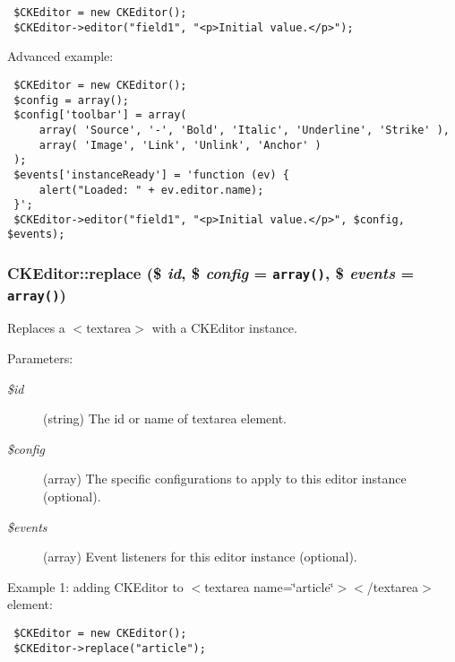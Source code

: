 \begin{Code}\begin{verbatim} $CKEditor = new CKEditor();
 $CKEditor->editor("field1", "<p>Initial value.</p>");
\end{verbatim}
\end{Code}



Advanced example: 

\begin{Code}\begin{verbatim} $CKEditor = new CKEditor();
 $config = array();
 $config['toolbar'] = array(
     array( 'Source', '-', 'Bold', 'Italic', 'Underline', 'Strike' ),
     array( 'Image', 'Link', 'Unlink', 'Anchor' )
 );
 $events['instanceReady'] = 'function (ev) {
     alert("Loaded: " + ev.editor.name);
 }';
 $CKEditor->editor("field1", "<p>Initial value.</p>", $config, $events);
\end{verbatim}
\end{Code}

 \hypertarget{classCKEditor_82ebacb89f96be38393ebd53a6a9ab52}{
\subsubsection[{replace}]{\setlength{\rightskip}{0pt plus 5cm}CKEditor::replace (\$ {\em id}, \/  \$ {\em config} = {\tt array()}, \/  \$ {\em events} = {\tt array()})}}
\label{classCKEditor_82ebacb89f96be38393ebd53a6a9ab52}


Replaces a $<$textarea$>$ with a CKEditor instance.

\begin{Desc}
\item[Parameters:]
\begin{description}
\item[{\em \$id}](string) The id or name of textarea element. \item[{\em \$config}](array) The specific configurations to apply to this editor instance (optional). \item[{\em \$events}](array) Event listeners for this editor instance (optional).\end{description}
\end{Desc}
Example 1: adding CKEditor to $<$textarea name=\char`\"{}article\char`\"{}$>$$<$/textarea$>$ element: 

\begin{Code}\begin{verbatim} $CKEditor = new CKEditor();
 $CKEditor->replace("article");
\end{verbatim}
\end{Code}

